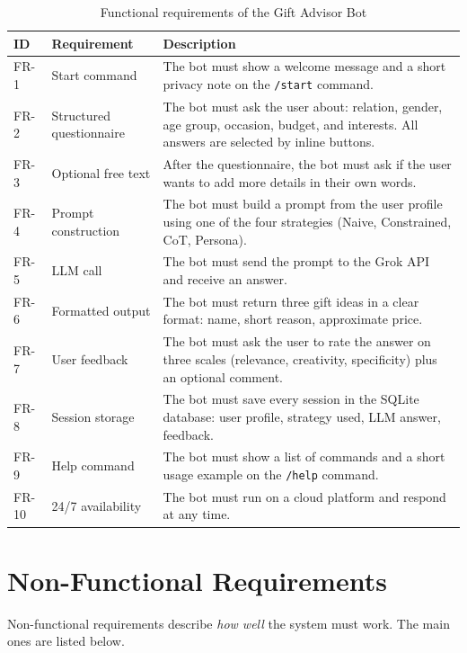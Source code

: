 \begin{table}[H]
\centering
\caption{Functional requirements of the Gift Advisor Bot}
\label{tab:func-reqs}
\begin{tabular}{p{1.5cm} p{4cm} p{8cm}}
\toprule
\textbf{ID} & \textbf{Requirement} & \textbf{Description} \\
\midrule
FR-1 & Start command & The bot must show a welcome message and a short privacy note on the \texttt{/start} command. \\
FR-2 & Structured questionnaire & The bot must ask the user about: relation, gender, age group, occasion, budget, and interests. All answers are selected by inline buttons. \\
FR-3 & Optional free text & After the questionnaire, the bot must ask if the user wants to add more details in their own words. \\
FR-4 & Prompt construction & The bot must build a prompt from the user profile using one of the four strategies (Naive, Constrained, CoT, Persona). \\
FR-5 & LLM call & The bot must send the prompt to the Grok API and receive an answer. \\
FR-6 & Formatted output & The bot must return three gift ideas in a clear format: name, short reason, approximate price. \\
FR-7 & User feedback & The bot must ask the user to rate the answer on three scales (relevance, creativity, specificity) plus an optional comment. \\
FR-8 & Session storage & The bot must save every session in the SQLite database: user profile, strategy used, LLM answer, feedback. \\
FR-9 & Help command & The bot must show a list of commands and a short usage example on the \texttt{/help} command. \\
FR-10 & 24/7 availability & The bot must run on a cloud platform and respond at any time. \\
\bottomrule
\end{tabular}
\end{table}

\section{Non-Functional Requirements}
\label{sec:nonfunc-reqs}

Non-functional requirements describe \textit{how well} the system must work. The main ones are listed below.

